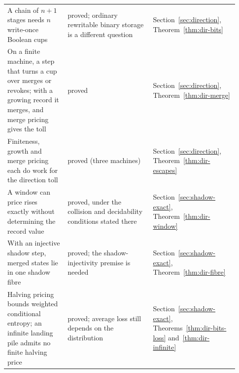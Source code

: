 \documentclass[11pt,twoside]{article}
\theoremstyle{thielethm}
\theoremstyle{thieledef}
\theoremstyle{thieledef}
\theoremstyle{thieledef}
\theoremstyle{thielethm}
\theoremstyle{thieleobs}
\theoremstyle{thielethm}
\begin{document}
\begin{longtable}{@{}>{\raggedright\arraybackslash}p{0.242\linewidth}>{\raggedright\arraybackslash}p{0.344\linewidth}>{\raggedright\arraybackslash}p{0.344\linewidth}@{}}
A chain of $n+1$ stages needs $n$ write-once Boolean cups & proved; ordinary rewritable binary storage is a different question & Section~\ref{sec:direction}, Theorem~\ref{thm:dir-bits} \\
On a finite machine, a step that turns a cup over merges or revokes; with a growing record it merges, and merge pricing gives the toll & proved & Section~\ref{sec:direction}, Theorem~\ref{thm:dir-merge} \\
Finiteness, growth and merge pricing each do work for the direction toll & proved (three machines) & Section~\ref{sec:direction}, Theorem~\ref{thm:dir-escapes} \\
A window can price rises exactly without determining the record value & proved, under the collision and decidability conditions stated there & Section~\ref{sec:shadow-exact}, Theorem~\ref{thm:dir-window} \\
With an injective shadow step, merged states lie in one shadow fibre & proved; the shadow-injectivity premise is needed & Section~\ref{sec:shadow-exact}, Theorem~\ref{thm:dir-fibre} \\
Halving pricing bounds weighted conditional entropy; an infinite landing pile admits no finite halving price & proved; average loss still depends on the distribution & Section~\ref{sec:shadow-exact}, Theorems~\ref{thm:dir-bits-loss} and~\ref{thm:dir-infinite} \\
\end{longtable}
\endgroup
\end{document}
